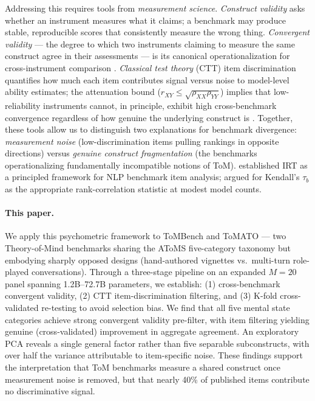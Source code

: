 \documentclass{article} %
\begin{document}
Addressing this requires tools from \textit{measurement science}.
\textit{Construct validity} \citep{cronbach1955construct,
salaudeen2025measurement} asks whether an instrument measures what it
claims; a benchmark may produce stable, reproducible scores that
consistently measure the wrong thing.
\textit{Convergent validity} --- the degree to which two instruments
claiming to measure the same construct agree in their assessments ---
is its canonical operationalization for cross-instrument comparison
\citep{perlitz2024benchbench}.
\textit{Classical test theory} (CTT) item discrimination
\citep{furr2014psychometrics, edelen2007applying} quantifies how much
each item contributes signal versus noise to model-level ability
estimates; the attenuation bound ($r_{XY} \leq
\sqrt{\rho_{XX}\rho_{YY}}$) implies that low-reliability instruments
cannot, in principle, exhibit high cross-benchmark convergence
regardless of how genuine the underlying construct is
\citep{furr2014psychometrics}.
Together, these tools allow us to distinguish two explanations for
benchmark divergence: \textit{measurement noise} (low-discrimination
items pulling rankings in opposite directions) versus \textit{genuine
construct fragmentation} (the benchmarks operationalizing fundamentally
incompatible notions of ToM).
\citet{lalor2016building} established IRT as a principled framework for
NLP benchmark item analysis; \citet{burnell2023revealing} argued for
Kendall's $\tau_b$ as the appropriate rank-correlation statistic at
modest model counts.

\paragraph{This paper.}
We apply this psychometric framework to ToMBench \citep{chen2024tombench}
and ToMATO \citep{shinoda2025tomato} --- two Theory-of-Mind benchmarks sharing the AToMS five-category taxonomy \citep{beaudoin2020atoms} but embodying sharply opposed designs (hand-authored vignettes vs.\ multi-turn role-played conversations).
Through a three-stage pipeline on an expanded $M{=}20$ panel spanning 1.2B--72.7B parameters, we establish: (1) cross-benchmark convergent validity, (2) CTT item-discrimination filtering, and (3) K-fold cross-validated re-testing to avoid selection bias.
We find that all five mental state categories achieve strong convergent validity pre-filter, with item filtering yielding genuine (cross-validated) improvement in aggregate agreement.
An exploratory PCA reveals a single general factor rather than five separable subconstructs, with over half the variance attributable to item-specific noise.
These findings support the interpretation that ToM benchmarks measure a shared construct once measurement noise is removed, but that nearly 40\% of published items contribute no discriminative signal.
\end{document}
